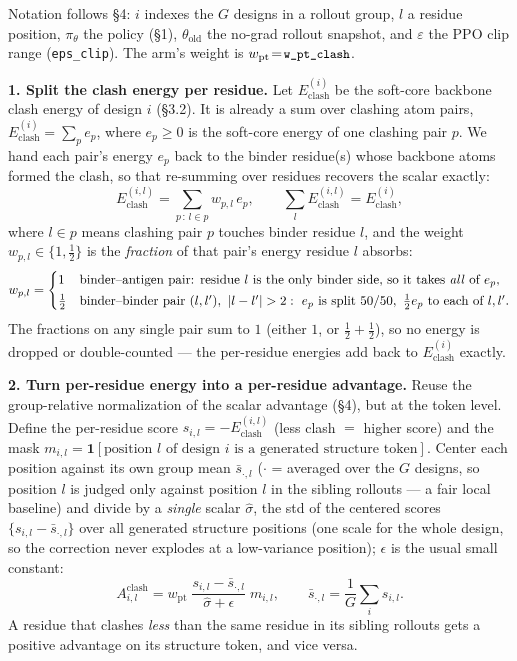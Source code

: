 \documentclass[11pt]{article}
\newcommand{\eclash}{E_{\mathrm{clash}}}
\newcommand{\ttk}[1]{\texttt{\small #1}}
\begin{document}
Notation follows \S4: $i$ indexes the $G$ designs in a rollout group, $l$ a residue position,
$\pi_\theta$ the policy (\S1), $\theta_{\mathrm{old}}$ the no-grad rollout snapshot, and
$\varepsilon$ the PPO clip range (\ttk{eps\_clip}). The arm's weight is
$w_{\mathrm{pt}}\!=\!\ttk{w\_pt\_clash}$.

\textbf{1. Split the clash energy per residue.} Let $\eclash^{(i)}$ be the soft-core backbone clash
energy of design $i$ (\S3.2). It is already a sum over clashing atom pairs, $\eclash^{(i)}=\sum_p e_p$,
where $e_p\ge 0$ is the soft-core energy of one clashing pair $p$. We hand each pair's energy $e_p$
back to the binder residue(s) whose backbone atoms formed the clash, so that re-summing over residues
recovers the scalar exactly:
\[
\eclash^{(i,l)}=\!\!\sum_{p\,:\,l\in p}\!\! w_{p,l}\,e_p,
\qquad
\sum_l \eclash^{(i,l)}=\eclash^{(i)} ,
\]
where $l\in p$ means clashing pair $p$ touches binder residue $l$, and the weight $w_{p,l}\in\{1,\tfrac12\}$
is the \emph{fraction} of that pair's energy residue $l$ absorbs:
\[
w_{p,l}=
\begin{cases}
1 & \text{binder--antigen pair: residue }l\text{ is the only binder side, so it takes \emph{all} of }e_p,\\[2pt]
\tfrac12 & \text{binder--binder pair }(l,l'),\ |l-l'|>2:\ e_p\text{ is split }50/50,\ \tfrac12 e_p\text{ to each of }l,l'.
\end{cases}
\]
The fractions on any single pair sum to $1$ (either $1$, or $\tfrac12+\tfrac12$), so no energy is dropped
or double-counted --- the per-residue energies add back to $\eclash^{(i)}$ exactly.

\textbf{2. Turn per-residue energy into a per-residue advantage.} Reuse the group-relative
normalization of the scalar advantage (\S4), but at the token level. Define the per-residue score
$s_{i,l}=-\eclash^{(i,l)}$ (less clash $=$ higher score) and the mask
$m_{i,l}=\mathbf 1[\text{position }l\text{ of design }i\text{ is a generated structure token}]$.
Center each position against its own group mean $\bar s_{\cdot,l}$ ($\cdot$ = averaged over the $G$
designs, so position $l$ is judged only against position $l$ in the sibling rollouts --- a fair local
baseline) and divide by a \emph{single} scalar $\hat\sigma$, the std of the centered scores
$\{s_{i,l}-\bar s_{\cdot,l}\}$ over all generated structure positions (one scale for the whole
design, so the correction never explodes at a low-variance position); $\epsilon$ is the usual small
constant:
\[
A^{\text{clash}}_{i,l}=w_{\mathrm{pt}}\;
   \frac{s_{i,l}-\bar s_{\cdot,l}}{\hat\sigma+\epsilon}\;m_{i,l},
\qquad
\bar s_{\cdot,l}=\frac1G\sum_{i} s_{i,l}.
\]
A residue that clashes \emph{less} than the same residue in its sibling rollouts gets a positive
advantage on its structure token, and vice versa.
\end{document}
